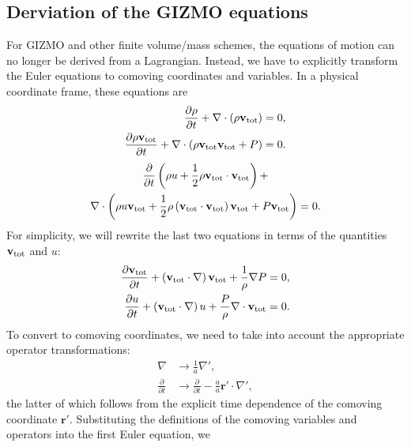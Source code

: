 \subsection{Derviation of the GIZMO equations}

For GIZMO and other finite volume/mass schemes, the equations of motion can no
longer be derived from a Lagrangian. Instead, we have to explicitly transform
the Euler equations to comoving coordinates and variables. In a physical
coordinate frame, these equations are
\begin{align}
\frac{\partial{}\rho{}}{\partial{}t} +
\nabla{} \cdot \left(\rho{} \mathbf{v}_{\rm tot} \right)
&= 0, \\
\frac{\partial{} \rho{} \mathbf{v}_{\rm tot} }{\partial{} t} +
\nabla{} \cdot \left( \rho{} \mathbf{v}_{\rm tot} \mathbf{v}_{\rm tot} +
P \right) &= 0.
\end{align}
\begin{multline}
\frac{\partial{}}{\partial{} t} \left( \rho{} u + \frac{1}{2} \rho{}
\mathbf{v}_{\rm{} tot}\cdot\mathbf{v}_{\rm{} tot} \right) +\\
\nabla{} \cdot \left( \rho{} u \mathbf{v}_{\rm{} tot} +
\frac{1}{2} \rho{} \left(\mathbf{v}_{\rm{} tot} \cdot \mathbf{v}_{\rm{} tot}\right)
\mathbf{v}_{\rm{} tot} + P \mathbf{v}_{\rm{} tot} \right) = 0.
\end{multline}
For simplicity, we will rewrite the last two equations in terms of the quantities
$\mathbf{v}_{\rm{} tot}$ and $u$:
\begin{align}
\frac{\partial{} \mathbf{v}_{\rm{} tot}}{\partial{} t} +
\left(\mathbf{v}_{\rm{} tot} \cdot \nabla{} \right) \mathbf{v}_{\rm{} tot} +
\frac{1}{\rho{}}\nabla{} P &= 0,\\
\frac{\partial{} u}{\partial{} t} +
\left(\mathbf{v}_{\rm{} tot} \cdot \nabla{} \right) u +
\frac{P}{\rho{}} \nabla{} \cdot \mathbf{v}_{\rm{} tot} &= 0.
\end{align}
To convert to comoving coordinates, we need to take into account the
appropriate operator transformations:
\begin{align}
\nabla{} &\rightarrow{} \frac{1}{a} \nabla{}', \\
\frac{\partial{}}{\partial{} t} &\rightarrow{}
\frac{\partial{}}{\partial{} t} - \frac{\dot{a}}{a} \mathbf{r}' \cdot \nabla{}',
\end{align}
the latter of which follows from the explicit time dependence of the
comoving coordinate $\mathbf{r}'$. Substituting the definitions of the
comoving variables and operators into the first Euler equation, we
